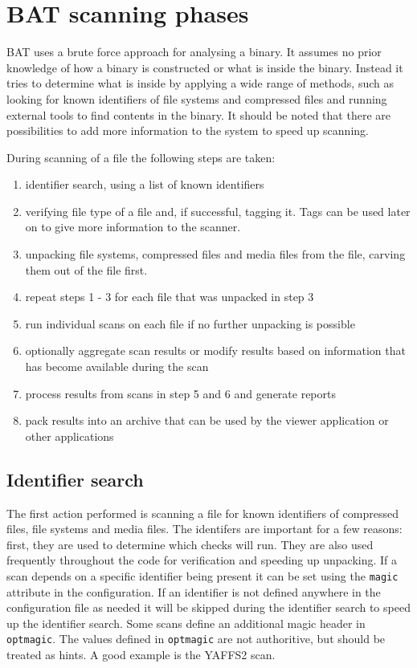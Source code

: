 \documentclass[10pt,a4paper]{article}
\begin{document}
\appendix

\section{BAT scanning phases}

BAT uses a brute force approach for analysing a binary. It assumes no prior
knowledge of how a binary is constructed or what is inside the binary. Instead
it tries to determine what is inside by applying a wide range of methods, such
as looking for known identifiers of file systems and compressed files and
running external tools to find contents in the binary. It should be noted that
there are possibilities to add more information to the system to speed up
scanning.

During scanning of a file the following steps are taken:

\begin{enumerate}
\item identifier search, using a list of known identifiers
\item verifying file type of a file and, if successful, tagging it. Tags can
be used later on to give more information to the scanner.
\item unpacking file systems, compressed files and media files from the file,
carving them out of the file first.
\item repeat steps 1 - 3 for each file that was unpacked in step 3
\item run individual scans on each file if no further unpacking is possible
\item optionally aggregate scan results or modify results based on information
that has become available during the scan
\item process results from scans in step 5 and 6 and generate reports
\item pack results into an archive that can be used by the viewer application
or other applications
\end{enumerate}

\subsection{Identifier search}

The first action performed is scanning a file for known identifiers of
compressed files, file systems and media files. The identifers are important
for a few reasons: first, they are used to determine which checks will run. They
are also used frequently throughout the code for verification and speeding up
unpacking. If a scan depends on a specific identifier being present it can be
set using the \texttt{magic} attribute in the configuration. If an identifier
is not defined anywhere in the configuration file as needed it will be skipped
during the identifier search to speed up the identifier search. Some scans
define an additional magic header in \texttt{optmagic}. The values defined in
\texttt{optmagic} are not authoritive, but should be treated as hints. A good
example is the YAFFS2 scan.
\end{document}
